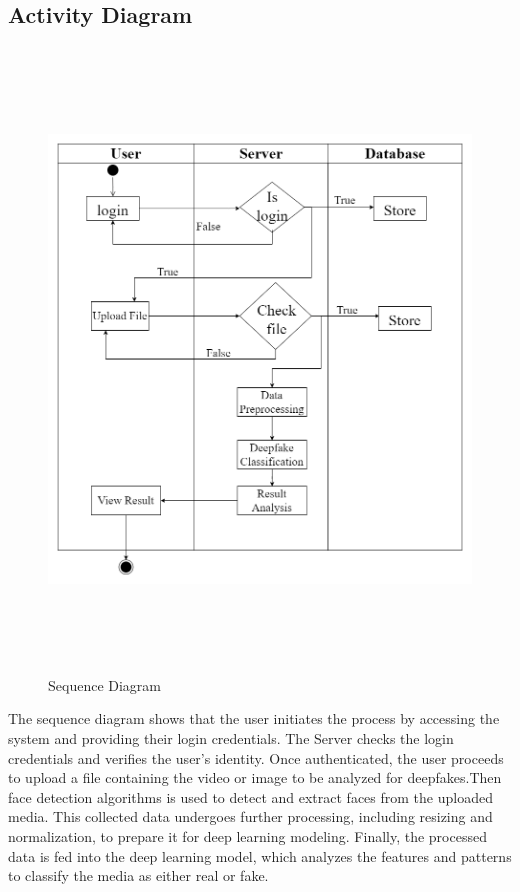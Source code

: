 
\subsection{Activity Diagram}
\begin{figure}[h]
    \centering
    \includegraphics[height=6.5in,width= 6in ]{img/activity diagram.drawio.png}
    \caption{Sequence Diagram}
\end{figure}
\justify
The sequence diagram shows that the user initiates the process by accessing the system and providing their login credentials. The Server checks the login credentials and verifies the user's identity. Once authenticated, the user proceeds to upload a file containing the video or image to be analyzed for deepfakes.Then face detection algorithms is used to detect and extract faces from the uploaded media. This collected data undergoes further processing, including resizing and normalization, to prepare it for deep learning modeling. Finally, the processed data is fed into the deep learning model, which analyzes the features and patterns to classify the media as either real or fake.
